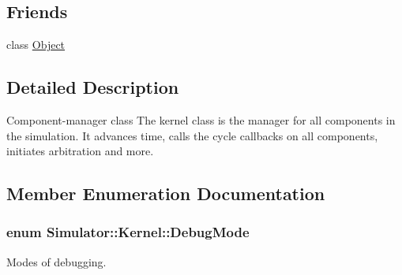 \subsection*{Friends}
\begin{DoxyCompactItemize}
\item 
class \hyperlink{class_simulator_1_1_kernel_a0720b5f434e636e22a3ed34f847eec57}{Object}
\end{DoxyCompactItemize}


\subsection{Detailed Description}
Component-\/manager class The kernel class is the manager for all components in the simulation. It advances time, calls the cycle callbacks on all components, initiates arbitration and more. 

\subsection{Member Enumeration Documentation}
\hypertarget{class_simulator_1_1_kernel_a69dec9d2b2d106e64de63f97301e234a}{
\subsubsection[{Debug\+Mode}]{\setlength{\rightskip}{0pt plus 5cm}enum {\bf Simulator\+::\+Kernel\+::\+Debug\+Mode}}}\label{class_simulator_1_1_kernel_a69dec9d2b2d106e64de63f97301e234a}


Modes of debugging. 

